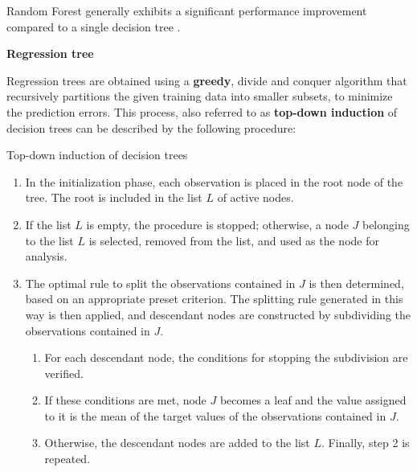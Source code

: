 Random Forest generally exhibits a significant performance improvement compared to a single decision tree \cite{Sharma2015}. 

\textbf{Regression tree}

Regression trees are obtained using a \textbf{greedy}, divide and conquer algorithm that recursively partitions the given training data into smaller subsets, to minimize the prediction errors. This process, also referred to as \textbf{top-down induction} of decision trees can be described by the following procedure: 
\begin{tcolorbox}[colback=blue!5, colframe=blue!80, colframe=white, boxrule=0pt]
\begin{algorithm}[H]
    \caption{Top-down induction of decision trees}
    \label{alg:tree_construction}
    \begin{enumerate}
        \item In the initialization phase, each observation is placed in the root node of the tree. The root is included in the list \( L \) of active nodes.
        \item If the list \( L \) is empty, the procedure is stopped; otherwise, a node \( J \) belonging to the list \( L \) is selected, removed from the list, and used as the node for analysis.
        \item The optimal rule to split the observations contained in \( J \) is then determined, based on an appropriate preset criterion. The splitting rule generated in this way is then applied, and descendant nodes are constructed by subdividing the observations contained in \( J \). 
        \begin{enumerate}
            \item For each descendant node, the conditions for stopping the subdivision are verified. 
            \item If these conditions are met, node \( J \) becomes a leaf and the value assigned to it is the mean of the target values of the observations contained in \( J \). 
            \item Otherwise, the descendant nodes are added to the list \( L \). Finally, step 2 is repeated.
        \end{enumerate}
    \end{enumerate}
\end{algorithm}
\end{tcolorbox}

